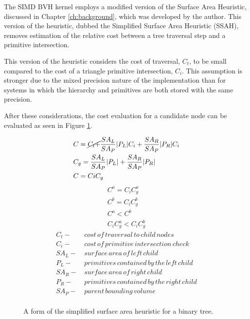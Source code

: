 The SIMD BVH kernel employs a modified version of the Surface Area Heuristic,
discussed in Chapter \ref{ch:background}, which was developed by the
author. This version of the heuristic, dubbed the Simplified Surface Area
Heuristic (SSAH), removes estimation of the relative cost between a tree
traversal step and a primitive intersection.

This version of the heuristic considers the cost of traversal, $C_{t}$, to be
small compared to the cost of a triangle primitive intersection, $C_{i}$. This
assumption is stronger due to the mixed precision nature of the implementation
than for systems in which the hierarchy and primitives are both stored with the
same precision.

After these considerations, the cost evaluation for a candidate node can be
evaluated as seen in Figure \ref{fig:SSAH}.

\begin{figure}[H]
  \begin{align}
&C =  \cancel{C_{t} +} \frac{SA_{L}}{SA_{P}} |P_{L}|C_{i} + \frac{SA_{R}}{SA_{P}} |P_{R}|C_{i} \\
&C_{g} = \frac{SA_{L}}{SA_{P}} |P_{L}| +  \frac{SA_{R}}{SA_{P}}|P_{R}| \\
&C = C{i}C_{g}
  \end{align}
  \begin{align*}
    C^{a} = C_{i} C^{a}_{g} \\
    C^{b} = C_{i} C^{b}_{g} \\
    C^{a} < C^{b} \\
    C_{i}C^{a}_{g} < C_{i}C^{b}_{g}
  \end{align*}
  \begin{align*}
    C_{t} - & \,cost\, of\, traversal\, to\, child\, nodes \\
    C_{i} - & \, cost\, of\, primitive\, intersection\, check\, \\
    SA_{L} - &  \,surface\, area\, of\, left\, child \\
    P_{L} - & \, primitives\, contained\, by\, the\, left\, child  \\
    SA_{R} - & \, surface\, area\, of\, right\, child \\
    P_{R} - & \, primitives\, contained\, by\, the\, right\, child \\
    SA_{P} - & \, parent\, bounding\, volume \\
  \end{align*}
  \caption{A form of the simplified surface area heuristic for a binary tree.}
  \label{fig:SSAH}
\end{figure}


